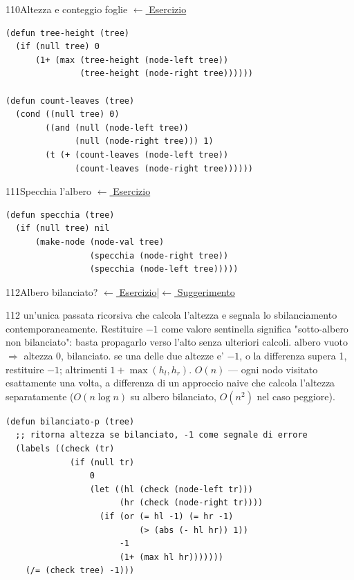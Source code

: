 \label{sol:110}
\begin{solbox}{110}{Altezza e conteggio foglie}
\small\color{black!55}\hyperref[ex:110]{$\leftarrow$ Esercizio}\normalsize\color{black}
\begin{lstlisting}
(defun tree-height (tree)
  (if (null tree) 0
      (1+ (max (tree-height (node-left tree))
               (tree-height (node-right tree))))))

(defun count-leaves (tree)
  (cond ((null tree) 0)
        ((and (null (node-left tree))
              (null (node-right tree))) 1)
        (t (+ (count-leaves (node-left tree))
              (count-leaves (node-right tree))))))
\end{lstlisting}
\end{solbox}

\label{sol:111}
\begin{solbox}{111}{Specchia l'albero}
\small\color{black!55}\hyperref[ex:111]{$\leftarrow$ Esercizio}\normalsize\color{black}
\begin{lstlisting}
(defun specchia (tree)
  (if (null tree) nil
      (make-node (node-val tree)
                 (specchia (node-right tree))
                 (specchia (node-left tree)))))
\end{lstlisting}
\end{solbox}

\label{sol:112}
\begin{solbox}{112}{Albero bilanciato?}
\small\color{black!55}\hyperref[ex:112]{$\leftarrow$ Esercizio}\enspace\textcolor{black!30}{|}\enspace\hyperref[hint:112]{$\leftarrow$ Suggerimento}\normalsize\color{black}
\begin{ragionamentoBox}{112}
 un'unica passata ricorsiva che calcola l'altezza e
segnala lo sbilanciamento contemporaneamente.
Restituire $-1$ come valore sentinella significa "sotto-albero non bilanciato":
basta propagarlo verso l'alto senza ulteriori calcoli.
 albero vuoto $\Rightarrow$ altezza $0$, bilanciato.
 se una delle due altezze e' $-1$, o la differenza
supera 1, restituire $-1$; altrimenti $1 + \max(h_l, h_r)$.
 $O(n)$ — ogni nodo visitato esattamente una volta,
a differenza di un approccio naive che calcola l'altezza separatamente
($O(n \log n)$ su albero bilanciato, $O(n^2)$ nel caso peggiore).
\end{ragionamentoBox}
\begin{lstlisting}
(defun bilanciato-p (tree)
  ;; ritorna altezza se bilanciato, -1 come segnale di errore
  (labels ((check (tr)
             (if (null tr)
                 0
                 (let ((hl (check (node-left tr)))
                       (hr (check (node-right tr))))
                   (if (or (= hl -1) (= hr -1)
                           (> (abs (- hl hr)) 1))
                       -1
                       (1+ (max hl hr)))))))
    (/= (check tree) -1)))
\end{lstlisting}
\end{solbox}

